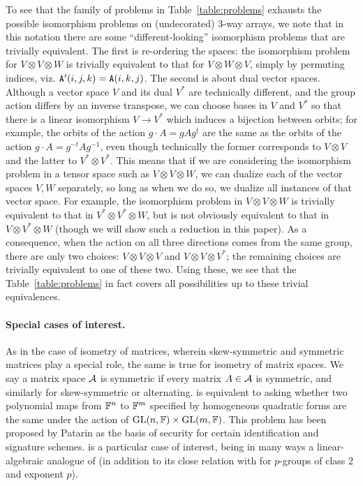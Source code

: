 \documentclass[11pt]{article}
\begin{document}
To see that the family of problems in Table~\ref{table:problems}
exhausts the possible isomorphism problems on (undecorated) 3-way 
arrays, we note that in this notation there are some 
``different-looking'' isomorphism problems that are trivially 
equivalent. The first is re-ordering the spaces: the isomorphism 
problem for $V \otimes V \otimes W$ is trivially equivalent to that 
for $V \otimes W \otimes V$, simply by permuting indices, viz. 
$\mathtt{A}'(i,j,k) = \mathtt{A}(i,k,j)$. The second is about dual vector spaces. 
Although a vector space $V$ and its dual $V^*$ are technically 
different, and the group action differs by an inverse transpose, we 
can choose bases in $V$ and $V^*$ so that there is a linear 
isomorphism $V \to V^*$ which induces a bijection between orbits; 
for example, the orbits of the action $g \cdot A = gAg^t$ are the 
same as the orbits of the action $g \cdot A = g^{-t} A g^{-1}$, even 
though technically the former corresponds to $V \otimes V$ and the 
latter to $V^* \otimes V^*$. This means that if we are considering 
the isomorphism problem in a tensor space such as $V \otimes V 
\otimes W$, we can dualize each of the vector spaces $V,W$ 
separately, so long as when we do so, we dualize all instances of 
that vector space. For example, the isomorphism problem in $V 
\otimes V \otimes W$ is trivially equivalent to that in $V^* \otimes 
V^* \otimes W$, but is not obviously equivalent to that in $V 
\otimes V^* \otimes W$ (though we will show such a reduction in this 
paper). As a consequence, when the action on all three directions 
comes from the same group, there are only two choices: $V \otimes V 
\otimes V$ and $V \otimes V \otimes V^*$; the remaining choices are 
trivially equivalent to one of these two. Using these, we see that 
the Table~\ref{table:problems} in fact covers all possibilities up to these 
trivial equivalences.

\paragraph{Special cases of interest.} As in the case of isometry of 
matrices, 
wherein skew-symmetric and symmetric matrices play a special role, the same is 
true for isometry of matrix spaces. We say a matrix space $\mathcal{A}$ is symmetric if 
every matrix $A \in \mathcal{A}$ is symmetric, and similarly for skew-symmetric or alternating. 
\SymMatSpIsomlong is equivalent to asking whether two 
polynomial maps from $\mathbb{F}^n$ to $\mathbb{F}^m$ specified by homogeneous quadratic forms are 
the same under the action of $\mathrm{GL}(n, \mathbb{F})\times \mathrm{GL}(m, \mathbb{F})$. This problem has been proposed 
by Patarin \cite{Pat96} as the basis of security for certain identification and 
signature schemes. 
\AltMatSpIsomlong is a particular case of interest, being 
in many ways a linear-algebraic analogue of \GI \cite{LQ17} (in addition to its 
close relation with \GpIlong for $p$-groups of class 2 and exponent $p$).
\end{document}
